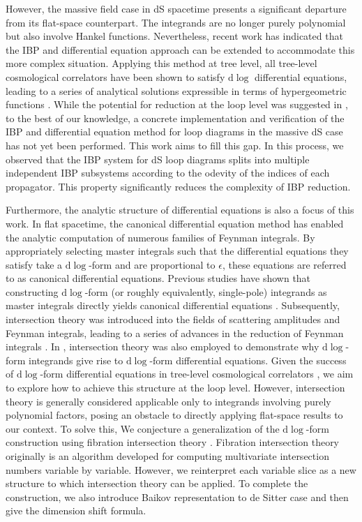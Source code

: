 \documentclass[a4paper]{article}
\def\di{{\mathrm{d}}}
\def\ep{\epsilon}
\begin{document}
However, the massive field case in dS spacetime presents a significant departure from its flat-space counterpart. The integrands are no longer purely polynomial but also involve Hankel functions. Nevertheless, recent work \cite{} has indicated that the IBP and differential equation approach can be extended to accommodate this more complex situation. Applying this method at tree level, all tree-level cosmological correlators have been shown to satisfy $\di \log$ differential equations, leading to a series of analytical solutions expressible in terms of hypergeometric functions \cite{}.
While the potential for reduction at the loop level was suggested in \cite{}, to the best of our knowledge, a concrete implementation and verification of the IBP and differential equation method for loop diagrams in the massive dS case has not yet been performed. This work aims to fill this gap. In this process, we observed that the IBP system for dS loop diagrams splits into multiple independent IBP subsystems according to the odevity of the indices of each propagator. This property significantly reduces the complexity of IBP reduction.

Furthermore, the analytic structure of differential equations is also a focus of this work. In flat spacetime, the canonical differential equation method \cite{} has enabled the analytic computation of numerous families of Feynman integrals. By appropriately selecting master integrals such that the differential equations they satisfy take a $\di \log$-form and are proportional to $\ep$, these equations are referred to as canonical differential equations. Previous studies have shown that constructing $\di \log$-form (or roughly equivalently, single-pole) integrands as master integrals directly yields canonical differential equations \cite{}. Subsequently, intersection theory \cite{} was introduced into the fields of scattering amplitudes and Feynman integrals, leading to a series of advances in the reduction of Feynman integrals \cite{}. In \cite{}, intersection theory was also employed to demonstrate why $\di \log$-form integrands give rise to $\di \log$-form differential equations. Given the success of $\di \log$-form differential equations in tree-level cosmological correlators \cite{}, we aim to explore how to achieve this structure at the loop level.
However, intersection theory is generally considered applicable only to integrands involving purely polynomial factors, posing an obstacle to directly applying flat-space results to our context. To solve this, We conjecture a generalization of the $\di \log$-form construction using fibration intersection theory \cite{}. Fibration intersection theory originally is an algorithm developed for computing multivariate intersection numbers variable by variable. However, we reinterpret each variable slice as a new structure to which intersection theory can be applied. To complete the construction, we also introduce Baikov representation \cite{} to de Sitter case and then give the dimension shift formula.
\end{document}
